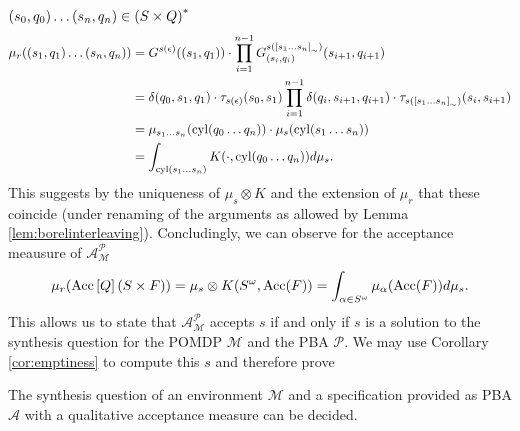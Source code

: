 $\left(s_{0}, q_{0}\right)\dots\left(s_{n}, q_{n}\right)\in\left(S\times Q\right)^{*}$
\begin{align*}
  \mu_{r}(\left(s_{1}, q_{1}\right)\dots\left(s_{n}, q_{n}\right)) &= 
    G^{s(\epsilon)}(\left(s_{1}, q_{1}\right))\cdot 
    \prod\limits_{i = 1}^{n-1}
      G^{s(\left[s_{1}\dots s_{n}\right]_{\sim})}_{\left(s_{i}, q_{i}\right)}(
        s_{i+1}, q_{i+1})\\
  &= \delta(q_{0}, s_{1}, q_{1})\cdot\tau_{s(\epsilon)}(s_{0}, s_{1})
    \prod\limits_{i = 1}^{n-1}
      \delta(q_{i}, s_{i+1}, q_{i+1})\cdot
      \tau_{s(\left[s_{1}\dots s_{n}\right]_{\sim})}(s_{i}, s_{i+1})\\
  &= \mu_{s_{1}\dots s_{n}}(\operatorname{cyl}(q_{0}\dots q_{n}))\cdot
    \mu_{s}(\operatorname{cyl}(s_{1}\dots s_{n}))\\
  &= \int_{\operatorname{cyl}(s_{1}\dots s_{n})}K(\cdot, \operatorname{cyl}(q_{0}\dots q_{n}))d\mu_{s}.
\end{align*}
This suggests by the uniqueness of $\mu_{s}\otimes K$ and the extension of
$\mu_{r}$ that these coincide (under renaming of the arguments as allowed by
Lemma \ref{lem:borelinterleaving}). Concludingly, we can observe for the 
acceptance meausure of $\mathcal{A}_{\mathcal{M}}^{\mathcal{P}}$
\begin{equation*}
  \mu_{r}(\operatorname{Acc}\left[Q\right](S\times F))
  = \mu_{s}\otimes K(S^{\omega}, \operatorname{Acc}(F))
  = \int_{\alpha\in S^{\omega}}\mu_{\alpha}(\operatorname{Acc}(F)) d\mu_{s}.
\end{equation*}
This allows us to state that $\mathcal{A}_{\mathcal{M}}^{\mathcal{P}}$ 
accepts $s$ if and only if $s$ is a solution to the synthesis question for 
the \ac{POMDP} $\mathcal{M}$ and the \ac{PBA} $\mathcal{P}$. We may use
Corollary \ref{cor:emptiness} to compute this $s$ and therefore prove
\begin{theorem}
  The synthesis question of an environment $\mathcal{M}$ and a specification
  provided as \ac{PBA} $\mathcal{A}$ with a qualitative acceptance measure
  can be decided.
  \label{thm:pbasynthesis}
\end{theorem}

